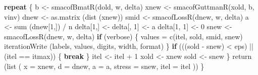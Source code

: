 \documentclass[
  12pt,
]{book}
\newenvironment{Shaded}{\begin{snugshade}}{\end{snugshade}}
\newcommand{\AttributeTok}[1]{\textcolor[rgb]{0.77,0.63,0.00}{#1}}
\newcommand{\ControlFlowTok}[1]{\textcolor[rgb]{0.13,0.29,0.53}{\textbf{#1}}}
\newcommand{\DecValTok}[1]{\textcolor[rgb]{0.00,0.00,0.81}{#1}}
\newcommand{\FunctionTok}[1]{\textcolor[rgb]{0.00,0.00,0.00}{#1}}
\newcommand{\NormalTok}[1]{#1}
\newcommand{\OtherTok}[1]{\textcolor[rgb]{0.56,0.35,0.01}{#1}}
\newcommand{\SpecialCharTok}[1]{\textcolor[rgb]{0.00,0.00,0.00}{#1}}
\theoremstyle{definition}
\theoremstyle{definition}
\theoremstyle{definition}
\theoremstyle{definition}
\theoremstyle{remark}
\begin{document}
\begin{Shaded}
\begin{Highlighting}[]
    \ControlFlowTok{repeat}\NormalTok{ \{}
\NormalTok{      b }\OtherTok{\textless{}{-}} \FunctionTok{smacofBmatR}\NormalTok{(dold, w, delta)}
\NormalTok{      xnew }\OtherTok{\textless{}{-}} \FunctionTok{smacofGuttmanR}\NormalTok{(xold, b, vinv)}
\NormalTok{      dnew }\OtherTok{\textless{}{-}} \FunctionTok{as.matrix}\NormalTok{ (}\FunctionTok{dist}\NormalTok{ (xnew))}
\NormalTok{      smid }\OtherTok{\textless{}{-}} \FunctionTok{smacofLossR}\NormalTok{(dnew, w, delta)}
\NormalTok{      a }\OtherTok{\textless{}{-}} \FunctionTok{sum}\NormalTok{ (dnew[}\DecValTok{1}\NormalTok{,]) }\SpecialCharTok{/}\NormalTok{ n}
\NormalTok{      delta[}\DecValTok{1}\NormalTok{,] }\OtherTok{\textless{}{-}}\NormalTok{ delta[, }\DecValTok{1}\NormalTok{] }\OtherTok{\textless{}{-}}\NormalTok{ a}
\NormalTok{      delta[}\DecValTok{1}\NormalTok{, }\DecValTok{1}\NormalTok{] }\OtherTok{\textless{}{-}} \DecValTok{0}
\NormalTok{      snew }\OtherTok{\textless{}{-}} \FunctionTok{smacofLossR}\NormalTok{(dnew, w, delta)}
      \ControlFlowTok{if}\NormalTok{ (verbose) \{}
\NormalTok{        values }\OtherTok{=} \FunctionTok{c}\NormalTok{(itel, sold, smid, snew)}
        \FunctionTok{iterationWrite}\NormalTok{ (labels, values, digits, width, format)}
\NormalTok{      \}}
      \ControlFlowTok{if}\NormalTok{ (((sold }\SpecialCharTok{{-}}\NormalTok{ snew) }\SpecialCharTok{\textless{}}\NormalTok{ eps) }\SpecialCharTok{||}\NormalTok{ (itel }\SpecialCharTok{==}\NormalTok{ itmax)) \{}
        \ControlFlowTok{break}
\NormalTok{      \}}
\NormalTok{      itel }\OtherTok{\textless{}{-}}\NormalTok{ itel }\SpecialCharTok{+} \DecValTok{1}
\NormalTok{      xold }\OtherTok{\textless{}{-}}\NormalTok{ xnew}
\NormalTok{      sold }\OtherTok{\textless{}{-}}\NormalTok{ snew}
\NormalTok{    \}}
    \FunctionTok{return}\NormalTok{ (}\FunctionTok{list}\NormalTok{ (}
      \AttributeTok{x =}\NormalTok{ xnew,}
      \AttributeTok{d =}\NormalTok{ dnew,}
      \AttributeTok{a =}\NormalTok{ a,}
      \AttributeTok{stress =}\NormalTok{ snew,}
      \AttributeTok{itel =}\NormalTok{ itel}
\NormalTok{    ))}
\NormalTok{  \}}


\end{Highlighting}
\end{Shaded}
\end{document}
